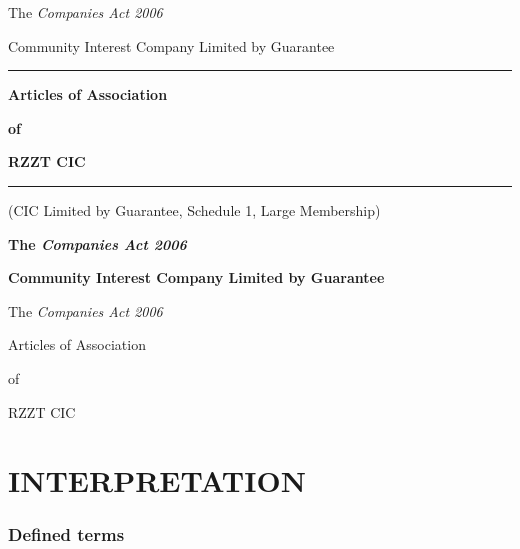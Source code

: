 \documentclass[a4paper,12pt]{article}
\begin{document}
\vspace*{\fill}

\begin{center}

The \textit{Companies Act 2006}

\vspace{1em}

Community Interest Company Limited by Guarantee

\vspace{\fill}

\hrule

\vspace{1em}

\textbf{Articles of Association}

\textbf{of}

\textbf{RZZT CIC}

\vspace{1em}

\hrule

\vspace{\fill}

(CIC Limited by Guarantee, Schedule 1, Large Membership)

\vspace{\fill}

\end{center}

\newpage

\begin{center}
\textbf{The \textit{Companies Act 2006}}

\textbf{Community Interest Company Limited by Guarantee}
\end{center}

\tableofcontents

\newpage

\begin{center}
The \textit{Companies Act 2006}\par Articles of Association\par of\par RZZT CIC
\end{center}

\vspace{2em}

\part*{INTERPRETATION}

\section{Defined terms}
\end{document}
